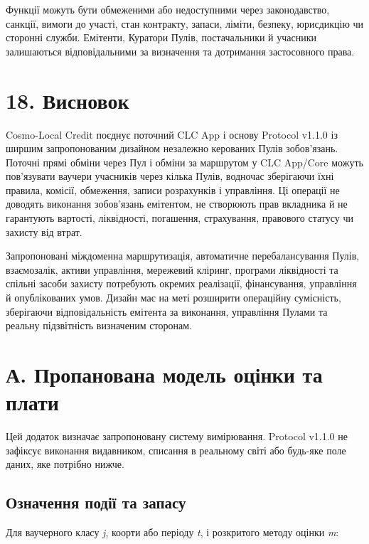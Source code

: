 \documentclass[11pt]{article}
\begin{document}
Функції можуть бути обмеженими або недоступними через законодавство, санкції, вимоги до участі, стан контракту, запаси, ліміти, безпеку, юрисдикцію чи сторонні служби. Емітенти, Куратори Пулів, постачальники й учасники залишаються відповідальними за визначення та дотримання застосовного права.


\section*{18. Висновок}

Cosmo-Local Credit поєднує поточний CLC App і основу Protocol v1.1.0 із ширшим запропонованим дизайном незалежно керованих Пулів зобов'язань. Поточні прямі обміни через Пул і обміни за маршрутом у CLC App/Core можуть пов'язувати ваучери учасників через кілька Пулів, водночас зберігаючи їхні правила, комісії, обмеження, записи розрахунків і управління. Ці операції не доводять виконання зобов'язань емітентом, не створюють прав вкладника й не гарантують вартості, ліквідності, погашення, страхування, правового статусу чи захисту від втрат.

Запропоновані міждоменна маршрутизація, автоматичне перебалансування Пулів, взаємозалік, активи управління, мережевий кліринг, програми ліквідності та спільні засоби захисту потребують окремих реалізації, фінансування, управління й опублікованих умов. Дизайн має на меті розширити операційну сумісність, зберігаючи відповідальність емітента за виконання, управління Пулами та реальну підзвітність визначеним сторонам.


\section*{А. Пропанована модель оцінки та плати}

Цей додаток визначає запропоновану систему вимірювання. Protocol v1.1.0 не зафіксує виконання видавником, списання в реальному світі або будь-яке поле даних, яке потрібно нижче.

\subsection*{Означення події та запасу}

Для ваучерного класу \emph{j}, коорти або періоду \emph{t}, і розкритого методу оцінки \emph{m}:
\end{document}
